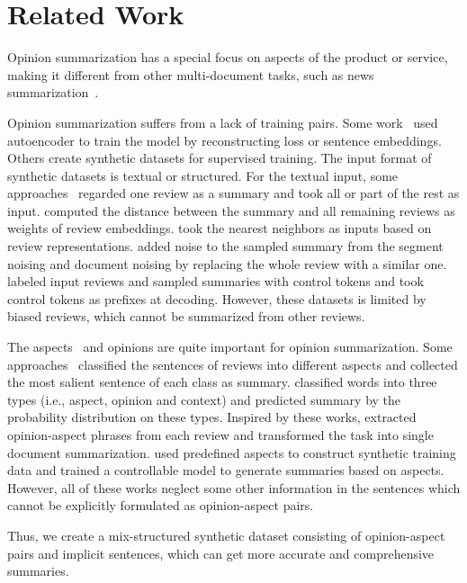 \section{Related Work}
\label{sec:related}

Opinion summarization 
has a special focus on aspects of the product or service, 
making it different from other multi-document tasks, 
such as news summarization~\cite{FabbriLSLR19}.

Opinion summarization suffers from a lack of training pairs. 
Some work~\cite{MeanSum19, Copycat20,tree21} used autoencoder to train the model by 
reconstructing loss or sentence embeddings. 
Others create synthetic datasets for supervised training. 
The input format of synthetic datasets is textual or structured.  
For the textual input,
some approaches~\cite{Fewshot20,transsum21}
regarded one review as a summary 
and took all or part of the rest as input. 
\citet{transsum21} computed the distance between the summary and all remaining reviews as weights of review embeddings.
\citet{Plansum20} took the nearest neighbors as inputs based on review representations.
\citet{Denoise20} added noise to the sampled summary from the segment noising and document noising by replacing the whole review with a similar one. 
\citet{prefix21} labeled input reviews and sampled summaries with control tokens and took control tokens as prefixes at decoding.
However, these datasets is limited by biased reviews, 
which cannot be summarized from other reviews. 


The aspects~\cite{luo2018extra,luo2019knowledge} and 
opinions are quite important 
for opinion summarization.
Some approaches~\cite{AngelidisL18,MukherjeePVGBG20} classified the sentences of reviews into different aspects and collected the most salient sentence of each class as summary.
\citet{TianY019} 
classified words into three types (i.e., aspect, opinion and context) and predicted summary by the probability distribution on these types.
Inspired by these works,
\citet{OpiDig20} extracted opinion-aspect phrases from each review and transformed the task into single document summarization. 
\citet{amplayo-etal-2021-aspect} used predefined aspects to construct synthetic training data and trained a controllable model to generate summaries based on aspects.
However, all of these works 
neglect some other information in the sentences which cannot be explicitly formulated as opinion-aspect pairs. 

Thus, we create a mix-structured synthetic dataset consisting of
opinion-aspect pairs and implicit sentences, which can get more accurate and comprehensive summaries.  
